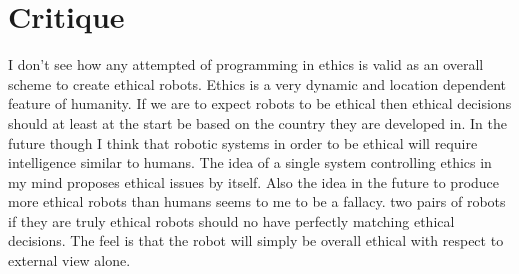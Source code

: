 \documentclass{article}
\begin{document}
\section*{Critique}
I don't see how any attempted of programming in ethics is valid as an overall scheme to create ethical robots. Ethics is a very dynamic and location dependent feature of humanity. If we are to expect robots to be ethical then ethical decisions should at least at the start be based on the country they are developed in. In the future though I think that robotic systems in order to be ethical will require intelligence similar to humans. The idea of a single system controlling ethics in my mind proposes ethical issues by itself. Also the idea in the future to produce more ethical robots than humans seems to me to be a fallacy. two pairs of robots if they are truly ethical robots should no have perfectly matching ethical decisions. The feel is that the robot will simply be overall ethical with respect to external view alone.
\cite{Arkin07governinglethal}
\end{document}

